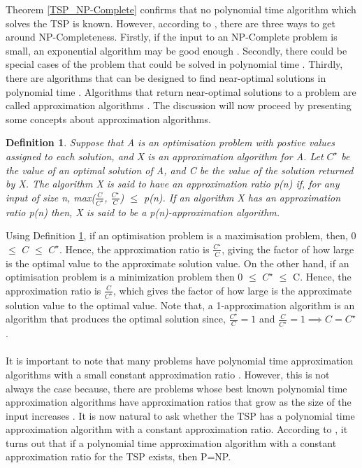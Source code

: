 \documentclass[12pt]{article}
\newtheorem{definition}{Definition}[subsection]
\numberwithin{equation}{subsection}
\numberwithin{table}{subsection}
\begin{document}
Theorem \ref{TSP_NP-Complete} confirms that no polynomial time algorithm which solves the TSP is known. However, according to \cite{cormen_leiserson_rivest_stein}, there are three ways to get around NP-Completeness. Firstly, if the input to an NP-Complete problem is small, an exponential algorithm may be good enough \cite{cormen_leiserson_rivest_stein}. Secondly, there could be special cases of the problem that could be solved in polynomial time \cite{cormen_leiserson_rivest_stein}. Thirdly, there are algorithms that can be designed to find near-optimal solutions in polynomial time \cite{cormen_leiserson_rivest_stein}. Algorithms that return near-optimal solutions to a problem are called approximation algorithms \cite{cormen_leiserson_rivest_stein}. The discussion will now proceed by presenting some concepts about approximation algorithms.
\begin{definition}
\label{p(n)-approximation algorithm}
Suppose that A is an optimisation problem with postive values assigned to each solution, and X is an approximation algorithm for A. Let $C^\star$ be the value of an optimal solution of A, and C be the value of the solution returned by X. The algorithm X is said to have an approximation ratio p(n) if, for any input of size n, max($\frac{C}{C^\star}$, $\frac{C^\star}{C}$) $\leq$ p(n). If an algorithm X has an approximation ratio p(n) then, X is said to be a p(n)-approximation algorithm. {}
\end{definition}
Using Definition \ref{p(n)-approximation algorithm}, if an optimisation problem is a maximisation problem, then, 0 $\le$ $C$ $\leq$ $C^\star$. Hence, the approximation ratio is $\frac{C^\star}{C}$, giving the factor of how large is the optimal value to the approximate solution value. On the other hand, if an optimisation problem is a minimization problem then 0 $\le$ $C^\star$ $\leq$ C. Hence, the approximation ratio is $\frac{C}{C^\star}$, which gives the factor of how large is the approximate solution value to the optimal value. Note that, a 1-approximation algorithm is an algorithm that produces the optimal solution since, $\frac{C^\star}{C} = 1$ and $\frac{C}{C^\star} = 1 \implies C = C^\star$. \cite{cormen_leiserson_rivest_stein}
\\\\
It is important to note that many problems have polynomial time approximation algorithms with a small constant approximation ratio \cite{cormen_leiserson_rivest_stein}. However, this is not always the case because, there are problems whose best known polynomial time approximation algorithms have approximation ratios that grow as the size of the input increases \cite{cormen_leiserson_rivest_stein}. It is now natural to ask whether the TSP has a polynomial time approximation algorithm with a constant approximation ratio. According to \cite{cormen_leiserson_rivest_stein}, it turns out that if a polynomial time approximation algorithm with a constant approximation ratio for the TSP exists, then P=NP.
\end{document}
